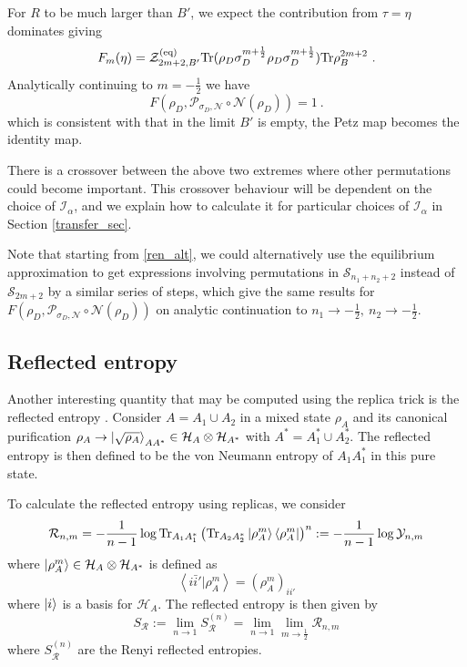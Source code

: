 \documentclass[a4paper,11pt]{article}
\newcommand\half{{\ensuremath{\frac{1}{2}}}}
\newcommand\vev[1]{{\ensuremath{\left\langle{#1}\right\rangle}}}
\newcommand{\be}{\begin{equation}}
\newcommand{\ee}{\end{equation}}
\newcommand\al{{\alpha}}
\newcommand\sig{\sigma}
\newcommand\ov{\over}
\newcommand\ha{{\half}}
\def\le{\left}
\def\ri{\right}
\newcommand\sI{{\ensuremath{{\mathcal I}}}}
\newcommand\sH{{\ensuremath{{\mathcal H}}}}
\newcommand\sR{{\mathcal R}}
\newcommand\sS{{\mathcal S}}
\newcommand\sY{{\mathcal Y}}
\newcommand\sZ{{\mathcal Z}}
\newcommand{\Tr}{\text{Tr}}
\begin{document}
 For $R$ to be much larger than $B'$, we expect the contribution from $\tau = \eta$ dominates giving 
\be 
F_m (\eta) = \sZ_{2m+2, B'}^{(\rm eq)} \Tr (\rho_D \sig_D^{m+\ha} \rho_D \sig_D^{m+\ha}) \Tr \rho_B^{2m+2} \ . 
\ee
Analytically continuing to $m =-\ha$ we have 
\be 
 F(\rho_D, \mathcal{P}_{\sigma_D, \mathcal{N}}\circ \mathcal{N}(\rho_D)) = 1 \ .
 \ee
which is consistent with that in the limit $B'$ is empty, the Petz map becomes the identity map. 


There is a crossover between the above two extremes where other permutations could become important. This crossover behaviour will be dependent on the choice of $\sI_{\al}$, and we explain how to calculate it for particular choices of $\sI_{\al}$ in Section \ref{transfer_sec}. 

Note that starting from \eqref{ren_alt}, we could alternatively use the equilibrium approximation to get expressions involving permutations in $\sS_{n_1 + n_2 +2}$ instead of $\sS_{2m +2}$ by a similar series of steps, which give the same results for $F(\rho_D, \mathcal{P}_{\sigma_D, \mathcal{N}}\circ \mathcal{N}(\rho_D))$ on analytic continuation to $n_1 \rightarrow - \ha,~ n_2 \rightarrow - \ha$. 

\subsection{Reflected entropy} \label{sec:refl}

Another interesting quantity that may be computed using the replica trick is the reflected entropy \cite{2019arXiv190500577D}. 
Consider $A = A_1 \cup A_2$ in a mixed state $\rho_{A}$ and its canonical purification $\rho_{A} \rightarrow \ket{\sqrt{\rho_{A}}}_{A A^*} \in \sH_A \otimes \sH_{A^*}$ with $A^* = A_1^* \cup A_2^*$. The reflected entropy is then defined to be the von Neumann entropy of $A_1 A_1^*$ in this pure state. 

To calculate the reflected entropy using replicas, we consider 
\be 
\sR_{n,m} = - {1 \ov n-1} \log \Tr_{A_1 A_1^*} \le(\Tr_{A_2 A_2^*} \ket{\rho_A^m} \bra{\rho_A^m} \ri)^n 
:= -{1 \ov n-1} \log \sY_{n,m} 
\ee
where $ \ket{\rho_A^m} \in \sH_A \otimes \sH_{A^*}$ is defined as
\be 
\vev{i \bar i' | \rho_A^m} = (\rho_A^m)_{i i'} 
\ee
where $\ket{i}$ is a basis for $\sH_A$. The reflected entropy is then given by 
\be 
S_\sR := \lim_{n \to 1} S_{\sR}^{(n)}= \lim_{n \to 1} \lim_{m \to \ha} \sR_{n,m} \label{SR_def}
\ee
where $S_{\sR}^{(n)}$ are the Renyi reflected entropies. 
\end{document}
